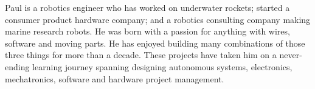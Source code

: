 

\begin{cvparagraph}

Paul is a robotics engineer who has worked on underwater rockets; started a
consumer product hardware company; and a robotics consulting company making marine
research robots. He was born with a passion for anything with wires, software
and moving parts. He has enjoyed building many combinations of those three things
for more than a decade. These projects have taken him on a never-ending learning
journey spanning designing autonomous systems, electronics, mechatronics,
software and hardware project management.
\end{cvparagraph}
